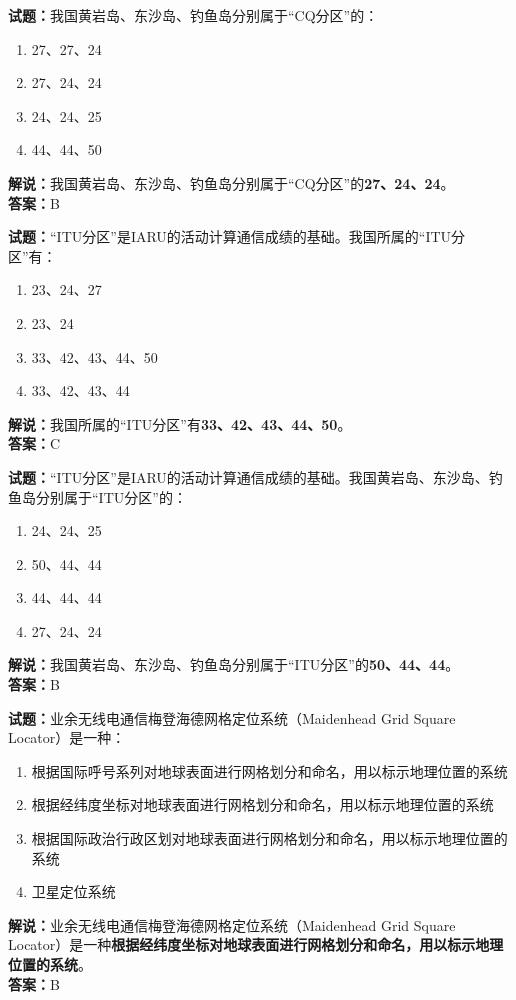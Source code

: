\documentclass{ctexbook}
\begin{document}
\vspace{1em}

\textbf{试题：}我国黄岩岛、东沙岛、钓鱼岛分别属于“CQ分区”的：
\begin{enumerate}[leftmargin=3em]
  \item 27、27、24
  \item 27、24、24
  \item 24、24、25
  \item 44、44、50
\end{enumerate}
\noindent\textbf{解说：}我国黄岩岛、东沙岛、钓鱼岛分别属于“CQ分区”的\textbf{27、24、24}。\\\noindent\textbf{答案：}B

\vspace{1em}

\textbf{试题：}“ITU分区”是IARU的活动计算通信成绩的基础。我国所属的“ITU分区”有：
\begin{enumerate}[leftmargin=3em]
  \item 23、24、27
  \item 23、24
  \item 33、42、43、44、50
  \item 33、42、43、44
\end{enumerate}
\noindent\textbf{解说：}我国所属的“ITU分区”有\textbf{33、42、43、44、50}。\\\noindent\textbf{答案：}C

\vspace{1em}

\textbf{试题：}“ITU分区”是IARU的活动计算通信成绩的基础。我国黄岩岛、东沙岛、钓鱼岛分别属于“ITU分区”的：
\begin{enumerate}[leftmargin=3em]
  \item 24、24、25
  \item 50、44、44
  \item 44、44、44
  \item 27、24、24
\end{enumerate}
\noindent\textbf{解说：}我国黄岩岛、东沙岛、钓鱼岛分别属于“ITU分区”的\textbf{50、44、44}。\\\noindent\textbf{答案：}B

\vspace{1em}

\textbf{试题：}业余无线电通信梅登海德网格定位系统（Maidenhead Grid Square Locator）是一种：
\begin{enumerate}[leftmargin=3em]
  \item 根据国际呼号系列对地球表面进行网格划分和命名，用以标示地理位置的系统
  \item 根据经纬度坐标对地球表面进行网格划分和命名，用以标示地理位置的系统
  \item 根据国际政治行政区划对地球表面进行网格划分和命名，用以标示地理位置的系统
  \item 卫星定位系统
\end{enumerate}
\noindent\textbf{解说：}业余无线电通信梅登海德网格定位系统（Maidenhead Grid Square Locator）是一种\textbf{根据经纬度坐标对地球表面进行网格划分和命名，用以标示地理位置的系统}。\\\noindent\textbf{答案：}B
\end{document}

